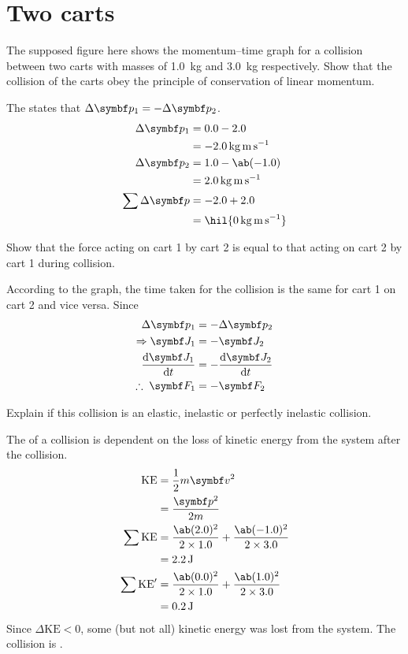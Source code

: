 \section{Two carts}
\begin{problem}
  The supposed figure here shows the momentum--time graph for a
  collision between
  two carts with masses of \qty{1.0}{\kg} and \qty{3.0}{\kg} respectively.
  Show that the collision of the carts obey the principle of conservation
  of linear momentum.
\end{problem}

The  states that
\(\Delta\mv{p}_1 = -\Delta\mv{p}_2\).
\begin{align*}
  \Delta\mv{p}_1 &= 0.0 - 2.0 \\
  &= \qty{-2.0}{\kg\m\per\second} \\
  \Delta\mv{p}_2 &= 1.0 - \ab(-1.0) \\
  &= \qty{2.0}{\kg\m\per\second} \\
  \sum\Delta\mv{p} &= -2.0 + 2.0 \\
  &= \hil{\qty{0}{\kg\m\per\second}}
\end{align*}

\begin{problem}
  Show that the force acting on cart 1 by cart 2 is equal to that
  acting on cart 2 by cart 1 during collision.
\end{problem}
According to the graph, the time taken for the collision is the same
for cart 1 on cart 2 and vice versa. Since
\begin{align*}
  \Delta\mv{p}_1 &= -\Delta\mv{p}_2 \\
  \Rightarrow \mv{J}_1 &= -\mv{J}_2 \\
  \odv{\mv{J}_1}{t} &= -\odv{\mv{J}_2}{t} \\
  \therefore\; \mv{F}_1 &= -\mv{F}_2
\end{align*}

\begin{problem}
  Explain if this collision is an elastic, inelastic or perfectly
  inelastic collision.
\end{problem}
The  of a collision is dependent on the loss of kinetic energy
from the system after the collision.
\begin{align*}
  \text{KE} &= \f{1}{2}m\mv{v}^2 \\
  &= \f{\mv{p}^2}{2m} \\
  \sum \text{KE} &= \f{\ab(2.0)^2}{2\times 1.0} +
  \f{\ab(-1.0)^2}{2\times 3.0} \\
  &= \qty{2.2}{\joule} \\
  \sum \text{KE}' &= \f{\ab(0.0)^2}{2\times 1.0} +
  \f{\ab(1.0)^2}{2\times 3.0} \\
  &= \qty{0.2}{\joule}
\end{align*}
Since \(\Delta\text{KE} < 0\), some (but not all) kinetic energy was
lost from the system. The collision is .

